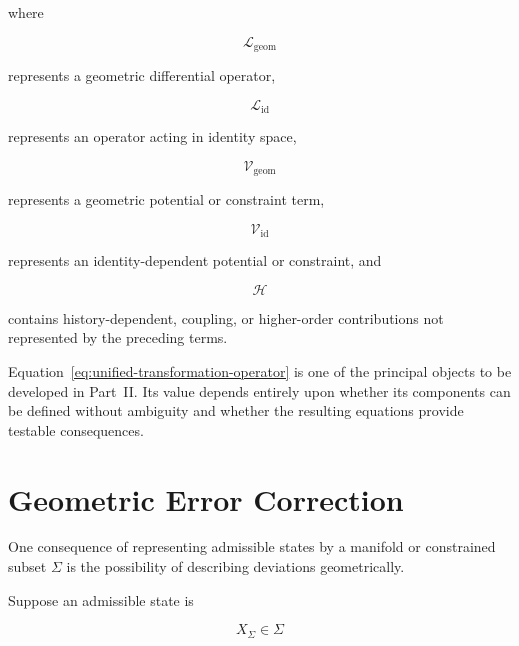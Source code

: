 \documentclass[12pt,oneside]{book}
\begin{document}
where

\begin{equation}
    \mathcal{L}_{\mathrm{geom}}
\end{equation}

represents a geometric differential operator,

\begin{equation}
    \mathcal{L}_{\mathrm{id}}
\end{equation}

represents an operator acting in identity space,

\begin{equation}
    \mathcal{V}_{\mathrm{geom}}
\end{equation}

represents a geometric potential or constraint term,

\begin{equation}
    \mathcal{V}_{\mathrm{id}}
\end{equation}

represents an identity-dependent potential or constraint, and

\begin{equation}
    \mathcal{H}
\end{equation}

contains history-dependent, coupling, or higher-order
contributions not represented by the preceding terms.

Equation~\eqref{eq:unified-transformation-operator} is one of
the principal objects to be developed in Part~II. Its value
depends entirely upon whether its components can be defined
without ambiguity and whether the resulting equations provide
testable consequences.


\section{Geometric Error Correction}
\label{sec:geometric-error-correction}

One consequence of representing admissible states by a manifold
or constrained subset \(\Sigma\) is the possibility of
describing deviations geometrically.

Suppose an admissible state is

\begin{equation}
    X_{\Sigma}
    \in
    \Sigma
\end{equation}
\end{document}
